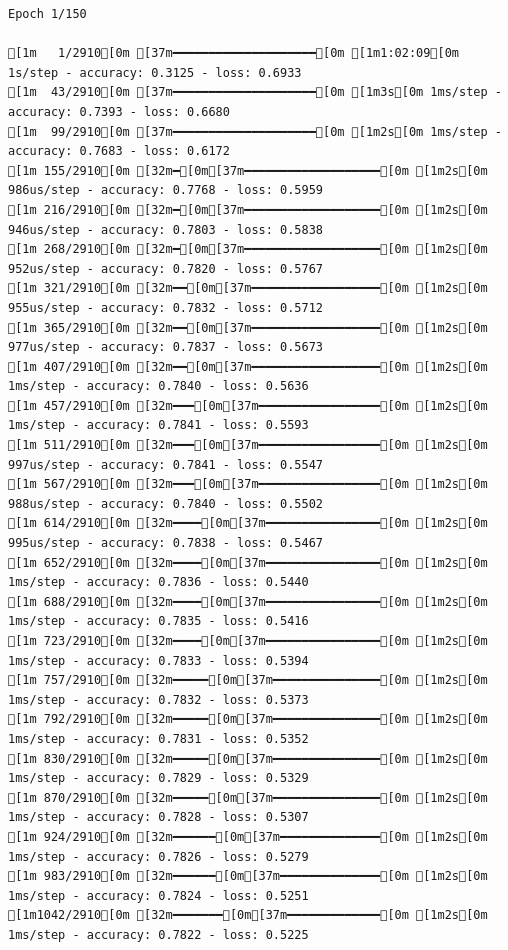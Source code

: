 \documentclass[
  letterpaper,
  DIV=11,
  numbers=noendperiod]{scrartcl}
\begin{document}
\begin{verbatim}
Epoch 1/150

[1m   1/2910[0m [37m━━━━━━━━━━━━━━━━━━━━[0m [1m1:02:09[0m 1s/step - accuracy: 0.3125 - loss: 0.6933
[1m  43/2910[0m [37m━━━━━━━━━━━━━━━━━━━━[0m [1m3s[0m 1ms/step - accuracy: 0.7393 - loss: 0.6680    
[1m  99/2910[0m [37m━━━━━━━━━━━━━━━━━━━━[0m [1m2s[0m 1ms/step - accuracy: 0.7683 - loss: 0.6172
[1m 155/2910[0m [32m━[0m[37m━━━━━━━━━━━━━━━━━━━[0m [1m2s[0m 986us/step - accuracy: 0.7768 - loss: 0.5959
[1m 216/2910[0m [32m━[0m[37m━━━━━━━━━━━━━━━━━━━[0m [1m2s[0m 946us/step - accuracy: 0.7803 - loss: 0.5838
[1m 268/2910[0m [32m━[0m[37m━━━━━━━━━━━━━━━━━━━[0m [1m2s[0m 952us/step - accuracy: 0.7820 - loss: 0.5767
[1m 321/2910[0m [32m━━[0m[37m━━━━━━━━━━━━━━━━━━[0m [1m2s[0m 955us/step - accuracy: 0.7832 - loss: 0.5712
[1m 365/2910[0m [32m━━[0m[37m━━━━━━━━━━━━━━━━━━[0m [1m2s[0m 977us/step - accuracy: 0.7837 - loss: 0.5673
[1m 407/2910[0m [32m━━[0m[37m━━━━━━━━━━━━━━━━━━[0m [1m2s[0m 1ms/step - accuracy: 0.7840 - loss: 0.5636  
[1m 457/2910[0m [32m━━━[0m[37m━━━━━━━━━━━━━━━━━[0m [1m2s[0m 1ms/step - accuracy: 0.7841 - loss: 0.5593
[1m 511/2910[0m [32m━━━[0m[37m━━━━━━━━━━━━━━━━━[0m [1m2s[0m 997us/step - accuracy: 0.7841 - loss: 0.5547
[1m 567/2910[0m [32m━━━[0m[37m━━━━━━━━━━━━━━━━━[0m [1m2s[0m 988us/step - accuracy: 0.7840 - loss: 0.5502
[1m 614/2910[0m [32m━━━━[0m[37m━━━━━━━━━━━━━━━━[0m [1m2s[0m 995us/step - accuracy: 0.7838 - loss: 0.5467
[1m 652/2910[0m [32m━━━━[0m[37m━━━━━━━━━━━━━━━━[0m [1m2s[0m 1ms/step - accuracy: 0.7836 - loss: 0.5440  
[1m 688/2910[0m [32m━━━━[0m[37m━━━━━━━━━━━━━━━━[0m [1m2s[0m 1ms/step - accuracy: 0.7835 - loss: 0.5416
[1m 723/2910[0m [32m━━━━[0m[37m━━━━━━━━━━━━━━━━[0m [1m2s[0m 1ms/step - accuracy: 0.7833 - loss: 0.5394
[1m 757/2910[0m [32m━━━━━[0m[37m━━━━━━━━━━━━━━━[0m [1m2s[0m 1ms/step - accuracy: 0.7832 - loss: 0.5373
[1m 792/2910[0m [32m━━━━━[0m[37m━━━━━━━━━━━━━━━[0m [1m2s[0m 1ms/step - accuracy: 0.7831 - loss: 0.5352
[1m 830/2910[0m [32m━━━━━[0m[37m━━━━━━━━━━━━━━━[0m [1m2s[0m 1ms/step - accuracy: 0.7829 - loss: 0.5329
[1m 870/2910[0m [32m━━━━━[0m[37m━━━━━━━━━━━━━━━[0m [1m2s[0m 1ms/step - accuracy: 0.7828 - loss: 0.5307
[1m 924/2910[0m [32m━━━━━━[0m[37m━━━━━━━━━━━━━━[0m [1m2s[0m 1ms/step - accuracy: 0.7826 - loss: 0.5279
[1m 983/2910[0m [32m━━━━━━[0m[37m━━━━━━━━━━━━━━[0m [1m2s[0m 1ms/step - accuracy: 0.7824 - loss: 0.5251
[1m1042/2910[0m [32m━━━━━━━[0m[37m━━━━━━━━━━━━━[0m [1m2s[0m 1ms/step - accuracy: 0.7822 - loss: 0.5225

\end{verbatim}
\end{document}
